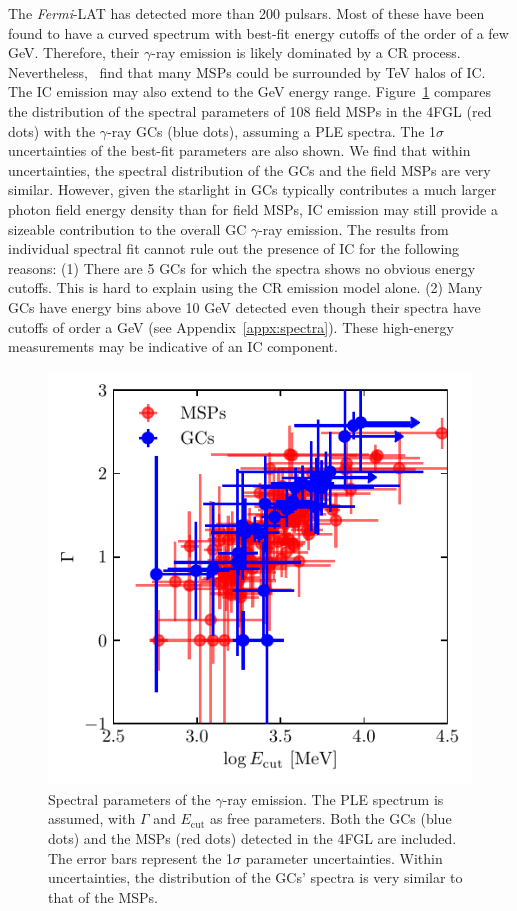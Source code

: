 \documentclass[doublespace,nopageskip]{VTthesis} %
\begin{document}
The \textit{Fermi}-LAT has detected more than 200 pulsars. Most of these have been found to have a curved spectrum with best-fit energy cutoffs of the order of a few GeV. Therefore, their $\gamma$-ray emission is likely dominated by a CR process. {Nevertheless,~\citet{2018PhRvD..98d3005H,2021arXiv210400014H} find} that many MSPs could be surrounded by TeV halos of IC. The IC emission may also extend to the GeV energy range. Figure~\ref{fig:msps} compares the distribution of the spectral parameters of 108 field MSPs in the 4FGL (red dots) with the $\gamma$-ray GCs (blue dots), assuming a PLE spectra. The 1$\sigma$ uncertainties of the best-fit parameters are also shown. We find that within uncertainties, the spectral distribution of the GCs and the field MSPs are very similar. However, given the starlight in GCs typically contributes a much larger photon field energy density than for field MSPs, IC emission may still provide a sizeable contribution to the overall GC $\gamma$-ray emission. The results from individual spectral fit cannot rule out the presence of IC for the following reasons: (1) There are 5 GCs for which the spectra shows no obvious energy cutoffs. This is hard to explain using the CR emission model alone. (2) Many GCs have energy bins above 10 GeV detected even though their spectra have cutoffs of order a GeV (see Appendix~\ref{appx:spectra}). These high-energy measurements may be indicative of an IC component.

\begin{figure}
    \centering
    \includegraphics[width=\columnwidth]{Figures/Globular/msp_vs_gc.pdf}
    \caption{Spectral parameters of the $\gamma$-ray emission. The PLE spectrum is assumed, with $\Gamma$ and $E_\mathrm{cut}$ as free parameters. Both the GCs (blue dots) and the MSPs (red dots) detected in the 4FGL are included. The error bars represent the 1$\sigma$ parameter uncertainties. Within uncertainties, the distribution of the GCs' spectra is very similar to that of the MSPs.}
    \label{fig:msps}
\end{figure}
\end{document}
